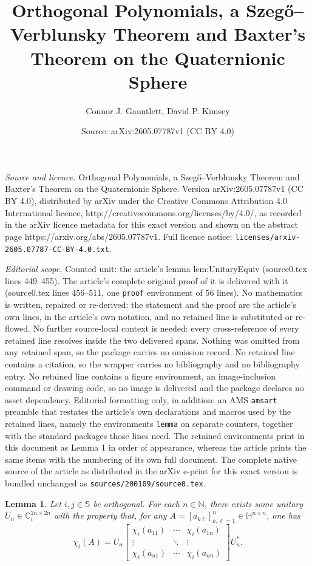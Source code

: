 \documentclass[10pt,a4paper]{amsart}
\title{Orthogonal Polynomials, a Szeg\H{o}--Verblunsky Theorem and Baxter's Theorem on the Quaternionic Sphere}
\author{Connor J. Gauntlett, David P. Kimsey}
\date{Source: arXiv:2605.07787v1 (CC BY 4.0)}
\newtheorem{lemma}{Lemma}
\def\CC{\mathbb{C}}
\def\HH{\mathbb{H}}
\def\NN{\mathbb{N}}
\def\SS{\mathbb{S}}
\def\x{\chi}
\begin{document}
\maketitle

\noindent\emph{Source and licence.} Orthogonal Polynomials, a Szeg\H{o}--Verblunsky Theorem and Baxter's Theorem on the Quaternionic Sphere. Version arXiv:2605.07787v1 (CC BY 4.0), distributed by arXiv under the Creative Commons Attribution 4.0 International licence, http://creativecommons.org/licenses/by/4.0/, as recorded in the arXiv licence metadata for this exact version and shown on the abstract page https://arxiv.org/abs/2605.07787v1. Full licence notice: \texttt{licenses/arxiv-2605.07787-CC-BY-4.0.txt}.\par\smallskip

\noindent\textit{Editorial scope.} Counted unit: the article's lemma lem:UnitaryEquiv (source0.tex lines 449--455). The article's complete original proof of it is delivered with it (source0.tex lines 456--511, one \texttt{proof} environment of 56 lines). No mathematics is written, repaired or re-derived: the statement and the proof are the article's own lines, in the article's own notation, and no retained line is substituted or re-flowed.  No further source-local context is needed: every cross-reference of every retained line resolves inside the two delivered spans.  Nothing was omitted from any retained span, so the package carries no omission record.  No retained line contains a citation, so the wrapper carries no bibliography and no bibliography entry.  No retained line contains a figure environment, an image-inclusion command or drawing code, so no image is delivered and the package declares no asset dependency.  Editorial formatting only, in addition: an AMS \texttt{amsart} preamble that restates the article's own declarations and macros used by the retained lines, namely the environments \texttt{lemma} on separate counters, together with the standard packages those lines need.  The retained environments print in this document as Lemma 1 in order of appearance, whereas the article prints the same items with the numbering of its own full document.  The complete native source of the article as distributed in the arXiv e-print for this exact version is bundled unchanged as \texttt{sources/200109/source0.tex}.
\begin{lemma}
    \label{lem:UnitaryEquiv}
    Let \(i,j \in \SS\) be orthogonal. For each \(n\in\NN\), there exists some unitary \(U_n \in \CC_i^{2n \times 2n}\) with the property that, for any \(A = [a_{k\ell}]_{k,\ell=1}^n \in \HH^{n\times n}\), one has 
    \[
        \x_i(A) = U_n \begin{bmatrix} \x_i(a_{11}) & \cdots & \x_i(a_{1n}) \\ \vdots & \ddots & \vdots \\ \x_i(a_{n1}) & \cdots & \x_i(a_{nn}) \end{bmatrix} U_n^*.
    \]
\end{lemma}
\end{document}
